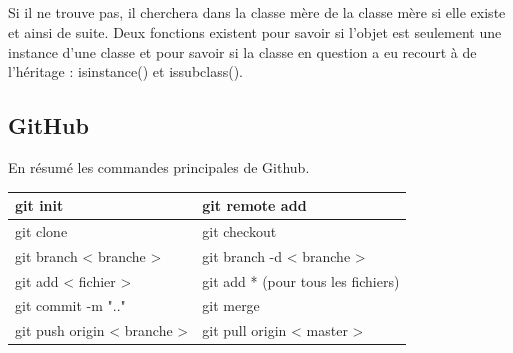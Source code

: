 \documentclass[a4paper, 12pt, twoside]{article}
\begin{document}
{{{{{\subparagraph{}{Si il ne trouve pas, il cherchera dans la classe mère de la classe mère si elle existe et ainsi de suite. Deux fonctions existent pour savoir si l'objet est seulement  une instance d'une classe et pour savoir si la classe en question a eu recourt à de l'héritage : isinstance() et issubclass(). }

\subsection{GitHub}
En résumé les commandes principales de \textsf{Github}.
\begin{center}
\begin{tabular}{|l|l|}
\hline
git init & git remote add \\ \hline
git clone & git checkout \\ \hline
git branch < branche > &  git branch -d < branche > \\ \hline
git add < fichier > &  git add * (pour tous les fichiers) \\ \hline
git commit -m ".." &  git merge \\ \hline
git push origin < branche > & git pull origin < master >  \\ \hline
\end{tabular}
\end{center}
\newpage
}}}}}
\end{document}
